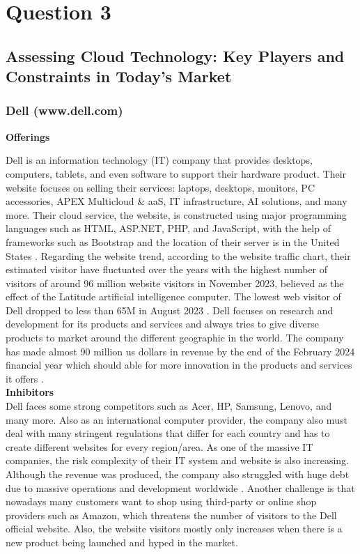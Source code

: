 \documentclass[12pt,a4paper]{article}
\begin{document}
\pagebreak


\setcounter{page}{4}
\section{Question 3}
\subsection{Assessing Cloud Technology: Key Players and Constraints in Today's Market}
\subsubsection{Dell (www.dell.com)} 

\noindent\textbf{Offerings} 

\noindent Dell is an information technology (IT) company that provides desktops, computers, tablets, and even software to support their hardware product. Their website focuses on selling their services: laptops, desktops, monitors, PC accessories, APEX Multicloud \& aaS, IT infrastructure, AI solutions, and many more. Their cloud service, the website, is constructed using major programming languages such as HTML, ASP.NET, PHP, and JavaScript, with the help of frameworks such as Bootstrap and the location of their server is in the United States \citep{question_3.1}. Regarding the website trend, according to the website traffic chart, their estimated visitor have fluctuated over the years with the highest number of visitors of around 96 million website visitors in November 2023, believed as the effect of the Latitude artificial intelligence computer. The lowest web visitor of Dell dropped to less than 65M in August 2023 \citep{question_3.2}. Dell focuses on research and development for its products and services and always tries to give diverse products to market around the different geographic in the world. The company has made almost 90 million us dollars in revenue by the end of the February 2024 financial year which should able for more innovation in the products and services it offers \citep{question_3.1}.\\

\noindent\textbf{Inhibitors }\\
Dell faces some strong competitors such as Acer, HP, Samsung, Lenovo, and many more. Also as an international computer provider, the company also must deal with many stringent regulations that differ for each country and has to create different websites for every region/area. As one of the massive IT companies, the risk complexity of their IT system and website is also increasing. Although the revenue was produced, the company also struggled with huge debt due to massive operations and development worldwide \citep{question_3.1}. Another challenge is that nowadays many customers want to shop using third-party or online shop providers such as Amazon, which threatens the number of visitors to the Dell official website. Also, the website visitors mostly only increases when there is a new product being launched and hyped in the market.\\
\end{document}
